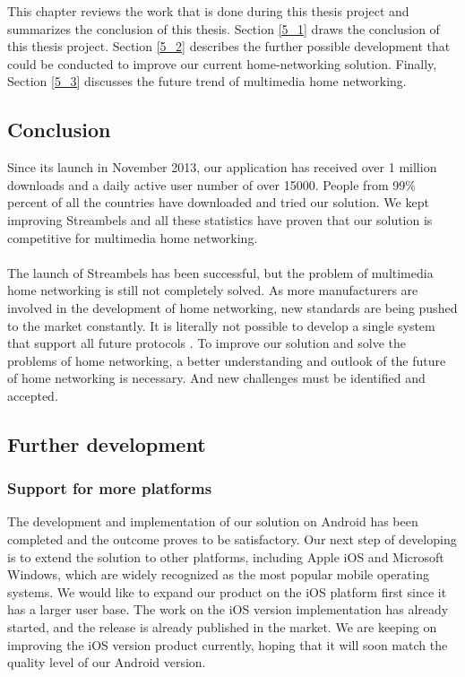 This chapter reviews the work that is done during this thesis project and
summarizes the conclusion of this thesis. Section \ref{5_1} draws the
conclusion of this thesis project. Section \ref{5_2} describes the further
possible development that could be conducted to improve our current home-networking solution. Finally, Section \ref{5_3} discusses the future trend of multimedia home networking.
\subsection{Conclusion\label{5_1}}
Since its launch in November 2013, our application has received over 1 million
downloads and a daily active user number of over 15000. People from 99\% percent
of all the countries have downloaded and tried our solution. We kept improving
Streambels and all these statistics have proven that our solution is competitive for multimedia home networking.\\
\\
The launch of Streambels has been successful, but the problem of multimedia
 home networking is still not completely solved. As more manufacturers are involved in the development of home networking, new standards are being pushed to the market constantly. It is literally not possible to develop a single system that support all future protocols . To improve our solution and solve the problems of home networking, a better understanding and outlook of the future of home networking is necessary. And new challenges must be identified and accepted.

\subsection{Further development\label{5_2}}
\subsubsection{Support for more platforms}
The development and implementation of our solution on Android has been completed and the outcome proves to be satisfactory. Our next step of developing is to extend the solution to other platforms, including Apple iOS and Microsoft Windows, which are widely recognized as the most popular mobile operating systems. We would like to expand our product on the iOS platform first since it has a larger user base. The work on the iOS version implementation has already started, and the release is already published in the market. We are keeping on improving the iOS version product currently, hoping that it will soon match the  quality level of our Android version.
